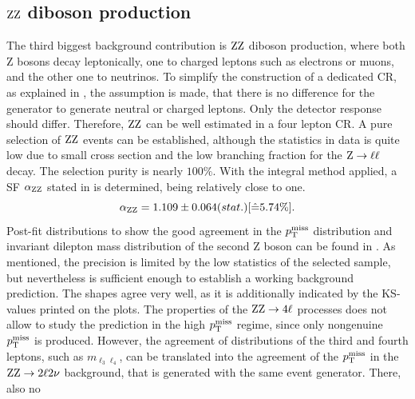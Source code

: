 \subsection{$\mathrm{Z}\mathrm{Z}$ diboson production}
The third biggest background contribution is $\mathrm{Z}\mathrm{Z}$ diboson production, where both Z bosons decay leptonically, one to charged leptons such as electrons or muons, and the other one to neutrinos. To simplify the construction of a dedicated CR, as explained in , the assumption is made, that there is no difference for the generator to generate neutral or charged leptons. Only the detector response should differ. Therefore, $\mathrm{Z}\mathrm{Z}$ can be well estimated in a four lepton CR. A pure selection of $\mathrm{Z}\mathrm{Z}$ events can be established, although the statistics in data is quite low due to small cross section and the low branching fraction for the $\mathrm{Z}\to\ell\ell$ decay. The selection purity is nearly $100\%$.
%
With the integral method applied, a SF $\alpha_{\mathrm{Z}\mathrm{Z}}$ stated in  is determined, being relatively close to one.
\begin{equation}\label{eq:AlphaZZ}
 \alpha_{\mathrm{Z}\mathrm{Z}}=1.109 \pm 0.064 (stat.) [\hat{=}5.74\%].
\end{equation}
Post-fit distributions to show the good agreement in the $p_{\mathrm{T}}^\text{miss}$ distribution and invariant dilepton mass distribution of the second Z boson can be found in . As mentioned, the precision is limited by the low statistics of the selected sample, but nevertheless is sufficient enough to establish a working background prediction. The shapes agree very well, as it is additionally indicated by the KS-values printed on the plots. The properties of the $\mathrm{Z}\mathrm{Z}\to4\ell$ processes does not allow to study the prediction in the high $p_{\mathrm{T}}^\text{miss}$ regime, since only nongenuine $p_{\mathrm{T}}^\text{miss}$ is produced. However, the agreement of distributions of the third and fourth leptons, such as $m_{\ell_3\ell_4}$, can be translated into the agreement of the $p_{\mathrm{T}}^\text{miss}$ in the $\mathrm{Z}\mathrm{Z}\to2\ell2\nu$ background, that is generated with the same event generator. There, also no
